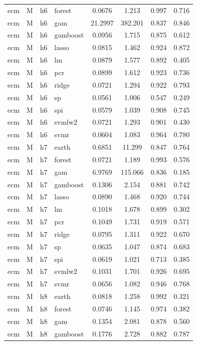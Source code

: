 \begin{ThreePartTable}
\begin{longtable}[t]{llclcccc}
ecm & M & h6 & forest & 0.0676 & 1.213 & 0.997 & 0.716\\
ecm & M & h6 & gam & 21.2997 & 382.201 & 0.837 & 0.846\\
ecm & M & h6 & gamboost & 0.0956 & 1.715 & 0.875 & 0.612\\
ecm & M & h6 & lasso & 0.0815 & 1.462 & 0.924 & 0.872\\
ecm & M & h6 & lm & 0.0879 & 1.577 & 0.892 & 0.405\\
ecm & M & h6 & pcr & 0.0899 & 1.612 & 0.923 & 0.736\\
ecm & M & h6 & ridge & 0.0721 & 1.294 & 0.922 & 0.793\\
ecm & M & h6 & sp & 0.0561 & 1.006 & 0.547 & 0.249\\
ecm & M & h6 & spi & 0.0579 & 1.039 & 0.908 & 0.745\\
ecm & M & h6 & svmlw2 & 0.0721 & 1.293 & 0.901 & 0.430\\
ecm & M & h6 & svmr & 0.0604 & 1.083 & 0.964 & 0.780\\
\addlinespace
ecm & M & h7 & earth & 0.6851 & 11.299 & 0.847 & 0.764\\
ecm & M & h7 & forest & 0.0721 & 1.189 & 0.993 & 0.576\\
ecm & M & h7 & gam & 6.9769 & 115.066 & 0.836 & 0.185\\
ecm & M & h7 & gamboost & 0.1306 & 2.154 & 0.881 & 0.742\\
ecm & M & h7 & lasso & 0.0890 & 1.468 & 0.920 & 0.744\\
ecm & M & h7 & lm & 0.1018 & 1.678 & 0.899 & 0.302\\
ecm & M & h7 & pcr & 0.1049 & 1.731 & 0.919 & 0.571\\
ecm & M & h7 & ridge & 0.0795 & 1.311 & 0.922 & 0.670\\
ecm & M & h7 & sp & 0.0635 & 1.047 & 0.874 & 0.683\\
ecm & M & h7 & spi & 0.0619 & 1.021 & 0.713 & 0.385\\
ecm & M & h7 & svmlw2 & 0.1031 & 1.701 & 0.926 & 0.695\\
ecm & M & h7 & svmr & 0.0656 & 1.082 & 0.946 & 0.768\\
\addlinespace
ecm & M & h8 & earth & 0.0818 & 1.258 & 0.992 & 0.321\\
ecm & M & h8 & forest & 0.0746 & 1.145 & 0.974 & 0.382\\
ecm & M & h8 & gam & 0.1354 & 2.081 & 0.878 & 0.560\\
ecm & M & h8 & gamboost & 0.1776 & 2.728 & 0.882 & 0.787\\

\end{longtable}
\end{ThreePartTable}
